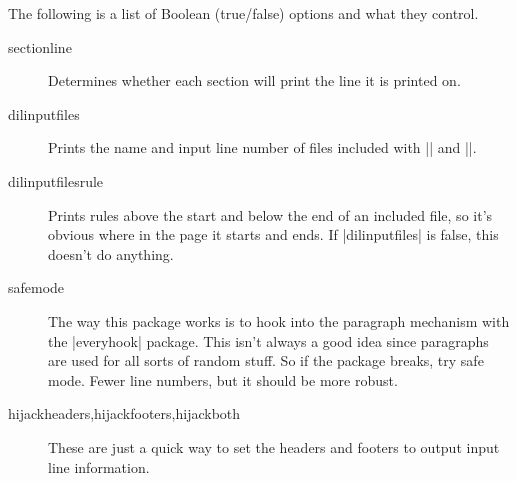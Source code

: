 \documentclass[twoside]{scrartcl}
\begin{document}
The following is a list of Boolean (true/false) options and what they
control.
\begin{description}
\item[sectionline] Determines whether each section will print the line
  it is printed on.
\item[dilinputfiles] Prints the name and input line number of files
  included with || and ||.
\item[dilinputfilesrule] Prints rules above the start and below the
  end of an included file, so it's obvious where in the page it starts
  and ends.
  If |dilinputfiles| is false, this doesn't do anything.
\item[safemode] The way this package works is to hook into the
  paragraph mechanism with the |everyhook| package.
  This isn't always a good idea since paragraphs are used for all
  sorts of random stuff.
  So if the package breaks, try safe mode. 
  Fewer line numbers, but it should be more robust.
\item[hijackheaders,hijackfooters,hijackboth] These are just a quick
  way to set the headers and footers to output input line information.
\end{description}
\end{document}

